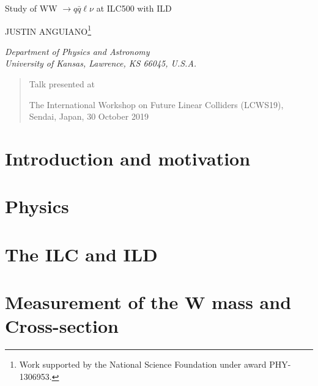 \documentclass[12pt]{article}
\newcommand\pubnumber{}
\newcommand\pubdate{\today}
\def\kansas{Department of Physics and Astronomy\\
University of Kansas, Lawrence, KS 66045, U.S.A.}
\def\support{\footnote{Work supported by the National Science Foundation  
                       under award PHY-1306953.}}
\def\Title#1{\begin{center} {\Large #1 } \end{center}}
\def\Author#1{\begin{center}{ \sc #1} \end{center}}
\def\Address#1{\begin{center}{ \it #1} \end{center}}
\newcommand\pubblock{\rightline{\begin{tabular}{l} \pubnumber\\
         \pubdate  \end{tabular}}}
\newenvironment{Abstract}{\begin{quotation}  }{\end{quotation}}
\newenvironment{Presented}{\begin{quotation} \begin{center} 
             Talk presented at \end{center}\bigskip 
      \begin{center}\begin{large}}{\end{large}\end{center} \end{quotation}}
\begin{document}
\begin{titlepage}
\pubblock

\vfill
\Title{Study of WW $\rightarrow q\bar{q}\ell\nu$ at ILC500 with ILD }
\vfill
\Author{JUSTIN ANGUIANO\support}
\Address{\kansas}
\vfill
\begin{Abstract}

\end{Abstract}
\vfill
\begin{Presented}
The International Workshop on Future Linear Colliders (LCWS19),\\
Sendai, Japan, 30 October 2019\\
\end{Presented}
\vfill
\end{titlepage}
\def\thefootnote{\fnsymbol{footnote}}
\setcounter{footnote}{0}
%



\section{Introduction and motivation}
\label{sec:Introduction}

\section{Physics}
\label{sec:physics}






\section{The ILC and ILD}
\label{sec:ILC_detector}



\section{Measurement of the W mass and Cross-section}
\label{Current_Work} 
\end{document}
